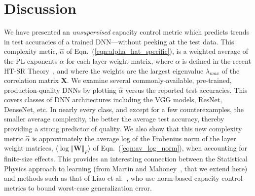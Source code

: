 \section{Discussion}
\label{sxn:discussion}

We have presented an \emph{unsupervised} capacity control metric which predicts trends in test accuracies of a trained DNN---without peeking at the test data. 
This complexity metic, $\hat{\alpha}$ of Eqn.~(\ref{eqn:alpha_hat_specific}), is a weighted average of the PL exponents $\alpha$ for each layer weight matrix, where $\alpha$ is defined in the recent HT-SR Theory~\cite{MM17_TR,MM18_TR}, and where the weights are the largest eigenvalue $\lambda_{max}$ of the correlation matrix $\mathbf{X}$.  
%
We examine several commonly-available, pre-trained, production-quality DNNs by plotting $\hat{\alpha}$ versus the reported test accuracies.
This covers classes of DNN architectures including the VGG models, ResNet, DenseNet, etc. 
In nearly every class, and except for a few counterexamples, the smaller average complexity, the better the average test accuracy, thereby providing a strong predictor of quality.
%
We also show that this new complexity metric $\hat{\alpha}$ is approximately the average log of the Frobenius norm of the layer weight matrices, $\langle\log\Vert\mathbf{W}\Vert_{F}\rangle$ of Eqn.~(\ref{eqn:av_log_norm}), when accounting for finite-size effects.
This provides an interesting connection between the Statistical Physics approach to learning (from Martin and Mahoney~\cite{MM17_TR,MM18_TR}, that we extend here) and methods such as that of Liao et al.~\cite{LMBx18_TR}, who use norm-based capacity control metrics to bound worst-case generalization error.

